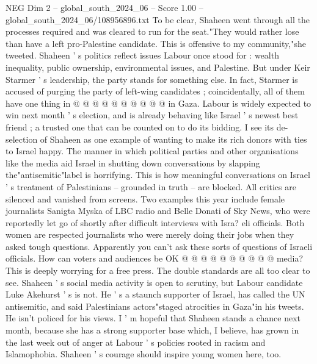 \begin{textsample}{NEG Dim 2 – global\_south\_2024\_06 – Score 1.00 – global\_south\_2024\_06/108956896.txt}
To be clear, Shaheen went through all the processes required and was cleared to run for the seat."They would rather lose than have a left pro-Palestine candidate.
This is offensive to my community,"she tweeted.
Shaheen ' s politics reflect issues Labour once stood for : wealth inequality, public ownership, environmental issues, and Palestine.
But under Keir Starmer ' s leadership, the party stands for something else.
In fact, Starmer is accused of purging the party of left-wing candidates ; coincidentally, all of them have one thing in @ @ @ @ @ @ @ @ @ @ in Gaza.
Labour is widely expected to win next month ' s election, and is already behaving like Israel ' s newest best friend ; a trusted one that can be counted on to do its bidding.
I see its de-selection of Shaheen as one example of wanting to make its rich donors with ties to Israel happy.
The manner in which political parties and other organisations like the media aid Israel in shutting down conversations by slapping the"antisemitic"label is horrifying.
This is how meaningful conversations on Israel ' s treatment of Palestinians -- grounded in truth -- are blocked.
All critics are silenced and vanished from screens.
Two examples this year include female journalists Sanigta Myska of LBC radio and Belle Donati of Sky News, who were reportedly let go of shortly after difficult interviews with Isra? eli officials.
Both women are respected journalists who were merely doing their jobs when they asked tough questions.
Apparently you can't ask these sorts of questions of Israeli officials.
How can voters and audiences be OK @ @ @ @ @ @ @ @ @ @ media?
This is deeply worrying for a free press.
The double standards are all too clear to see.
Shaheen ' s social media activity is open to scrutiny, but Labour candidate Luke Akehurst ' s is not.
He ' s a staunch supporter of Israel, has called the UN antisemitic, and said Palestinians actors"staged atrocities in Gaza"in his tweets.
He isn't policed for his views.
I ' m hopeful that Shaheen stands a chance next month, because she has a strong supporter base which, I believe, has grown in the last week out of anger at Labour ' s policies rooted in racism and Islamophobia.
Shaheen ' s courage should inspire young women here, too.

\end{textsample}
